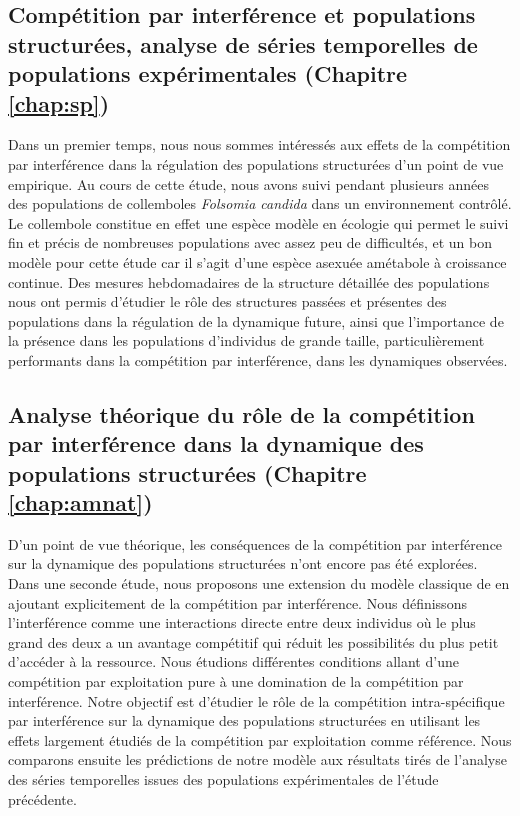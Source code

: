 \subsection{Compétition par interférence et populations structurées,
analyse de séries temporelles de populations expérimentales (Chapitre \ref{chap:sp})}

Dans un premier temps, nous nous sommes intéressés aux effets de la compétition
par interférence dans la régulation des populations structurées d'un point de
vue empirique. Au cours de cette étude, nous avons suivi pendant plusieurs années
des populations de collemboles \textit{Folsomia candida} dans un environnement
contrôlé. Le collembole constitue en effet une espèce modèle en écologie
\autocites{fountain2005a} qui permet le suivi fin et précis de nombreuses
populations avec assez peu de difficultés, et un bon modèle pour cette étude car
il s'agit d'une espèce asexuée amétabole à croissance continue.
Des mesures hebdomadaires de la structure détaillée des populations nous ont permis d'étudier le rôle des
structures passées et présentes des populations dans la régulation de la
dynamique future, ainsi que l'importance de la présence dans les populations
d'individus de grande taille, particulièrement performants dans la compétition par interférence, dans les
dynamiques observées. 

\subsection{Analyse théorique du rôle de la compétition par interférence dans
la dynamique des populations structurées (Chapitre \ref{chap:amnat})}

D'un point de vue théorique, les conséquences de la compétition par interférence
sur la dynamique des populations structurées n'ont encore pas été explorées.
Dans une seconde étude, nous proposons une extension du modèle classique de
\textcites{kooijman1984a} en ajoutant explicitement de la compétition par
interférence. Nous définissons l'interférence comme une interactions directe
entre deux individus où le plus grand des deux a un avantage compétitif qui
réduit les possibilités du plus petit d'accéder à la ressource. Nous étudions
différentes conditions allant d'une compétition par exploitation pure à une
domination de la compétition par interférence. Notre objectif est d'étudier le
rôle de la compétition intra-spécifique par interférence sur la dynamique des
populations structurées en utilisant les effets largement étudiés de la
compétition par exploitation comme référence. Nous comparons ensuite les
prédictions de notre modèle aux résultats tirés de l'analyse des séries
temporelles issues des populations expérimentales de l'étude précédente.


